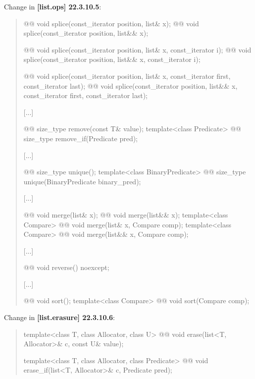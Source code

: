 \documentclass{wg21}
\begin{document}
Change in \textbf{[list.ops] 22.3.10.5}:
\begin{quote}
\begin{itemdecl}
@@ void splice(const_iterator position, list& x);
@@ void splice(const_iterator position, list&& x);

@@ void splice(const_iterator position, list& x, const_iterator i);
@@ void splice(const_iterator position, list&& x, const_iterator i);

@@ void splice(const_iterator position, list& x, const_iterator first,
const_iterator last);
@@ void splice(const_iterator position, list&& x, const_iterator first,
const_iterator last);
\end{itemdecl}
[...]
\begin{itemdecl}
@@ size_type remove(const T& value);
template<class Predicate> @@ size_type remove_if(Predicate pred);
\end{itemdecl}
[...]
\begin{itemdecl}
@@ size_type unique();
template<class BinaryPredicate> @@ size_type unique(BinaryPredicate binary_pred);
\end{itemdecl}
[...]
\begin{itemdecl}
@@ void merge(list& x);
@@ void merge(list&& x);
template<class Compare> @@ void merge(list& x, Compare comp);
template<class Compare> @@ void merge(list&& x, Compare comp);
\end{itemdecl}
[...]
\begin{itemdecl}
@@ void reverse() noexcept;
\end{itemdecl}
[...]
\begin{itemdecl}
@@ void sort();
template<class Compare> @@ void sort(Compare comp);
\end{itemdecl}
\end{quote}

Change in \textbf{[list.erasure] 22.3.10.6}:
\begin{quote}
\begin{itemdecl}
template<class T, class Allocator, class U>
  @@ void erase(list<T, Allocator>& c, const U& value);
  
template<class T, class Allocator, class Predicate>
  @@ void erase_if(list<T, Allocator>& c, Predicate pred);  
\end{itemdecl}
\end{quote}
\end{document}
